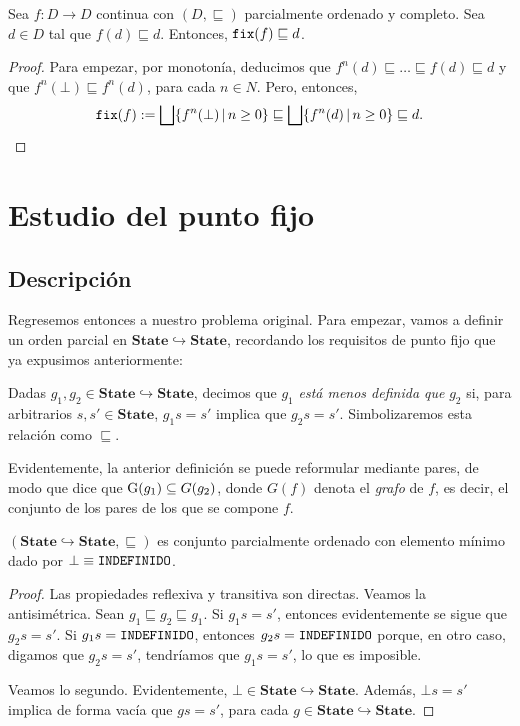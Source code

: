 \begin{prop}
Sea $f: D \to D$ continua con $(D, \sqsubseteq)$ parcialmente ordenado y completo. Sea $d \in D$ tal que $f(d)\sqsubseteq d$. Entonces, $\texttt{fix}(f) \sqsubseteq d$.
\end{prop}
\begin{proof}
Para empezar, por monotonía, deducimos que $f^n(d)\sqsubseteq \dots \sqsubseteq f(d) \sqsubseteq d$ y que $f^{n}(\bot) \sqsubseteq f^n(d)$, para cada $n \in N$. Pero, entonces, 
$$\texttt{fix}(f) := \bigsqcup\{f^n(\bot) \, | \, n \geq 0\} \sqsubseteq \bigsqcup\{f^n(d) \, | \, n \geq 0\} \sqsubseteq d.$$
\end{proof}


\section{Estudio del punto fijo}


\subsection{Descripción}

Regresemos entonces a nuestro problema original. Para empezar, vamos a definir un orden parcial en $\mathbf{State}\hookrightarrow \mathbf{State}$, recordando los requisitos de punto fijo que ya expusimos anteriormente:
\begin{definition}
Dadas $g_1, g_2 \in \mathbf{State}\hookrightarrow \mathbf{State}$, decimos que $g_1$ \textit{está menos definida que} $g_2$ si, para arbitrarios $s, s' \in \mathbf{State}$, $g_1 s = s'$ implica que $g_2 s = s'$. Simbolizaremos esta relación como $\sqsubseteq$. 
\end{definition}
Evidentemente, la anterior definición se puede reformular mediante pares, de modo que dice que $\mathrm{G}(g_1)\subseteq G(g_2)$, donde $G(f)$ denota el \textit{grafo} de $f$, es decir, el conjunto de los pares de los que se compone $f$.

\begin{lema}
$(\mathbf{State}\hookrightarrow \mathbf{State}, \sqsubseteq)$ es conjunto parcialmente ordenado con elemento mínimo dado por $\bot \equiv \texttt{INDEFINIDO}$.
\end{lema}
\begin{proof}
Las propiedades reflexiva y transitiva son directas. Veamos la antisimétrica. Sean $g_1 \sqsubseteq g_2 \sqsubseteq g_1$. Si $g_1s = s'$, entonces evidentemente se sigue que $g_2s = s'$. Si $g_1s = \texttt{INDEFINIDO}$, entonces $g_2s = \texttt{INDEFINIDO}$ porque, en otro caso, digamos que $g_2s = s'$, tendríamos que $g_1s=s'$, lo que es imposible.

Veamos lo segundo. Evidentemente, $\bot \in \mathbf{State}\hookrightarrow \mathbf{State}$. Además, $\bot s = s'$ implica de forma vacía que $gs = s'$, para cada $g \in \mathbf{State}\hookrightarrow \mathbf{State}$.
\end{proof}

